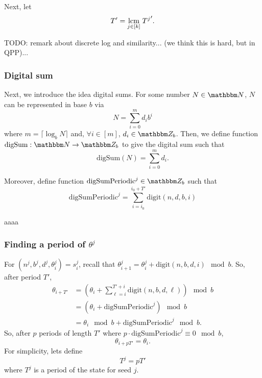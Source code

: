 \documentclass[11pt,titlepage]{article}
\newcommand{\rationalPeriod}{{T^j}'}
\newcommand{\rationalPeriodTotal}{{T}'}
\newcommand{\seedAngle}[1]{{\theta^j_{#1}}}
\newcommand{\seedAngleNotime}{{\theta}^j}
\newcommand{\digSumPeriodic}{\mathrm{digSumPeriodic}^j}
\begin{document}
Next, let $$
\rationalPeriodTotal = \lcm{j \in [k]}\; \rationalPeriod.
$$

\begin{remark}[Polytime]
  TODO: remark about discrete log and similarity... (we think this is hard, but in QPP)...
\end{remark}

\subsubsection{Digital sum}
Next, we introduce the idea digital sums.
For some number $N \in \N$, $N$ can be represented in base $b$ via
\begin{equation}
  N = \sum_{i=0}^{m} d_i b^i
\end{equation}
where $m = \lceil \log_b N \rceil$ and, $\forall i \in [m]$, $d_i \in \Z_b$.
Then, we define function $\mathrm{digSum}: \N \rightarrow \Z_b$
to give the digital sum such that
\begin{equation}
  \mathrm{digSum}(N) = \sum_{i=0}^{m} d_i.
\end{equation}

Moreover, define function $\digSumPeriodic \in \Z_b$
such that
\begin{equation}
  \digSumPeriodic = \sum_{i = i_0}^{i_0 + \rationalPeriodTotal} \mathrm{digit}(n, d, b, i)
\end{equation}

\begin{remark}
  aaaa
\end{remark}

\subsubsection{Finding a period of $\seedAngleNotime$} %
For $(n^j, b^j, d^j, \theta_i^j) = s_i^j$,
recall that $\seedAngle{i + 1} = \seedAngle{i} + \mathrm{digit}(n, b, d, i) \mod b$.
So, after period $\rationalPeriodTotal$,
\begin{align*}
  \theta_{i + \rationalPeriodTotal} &= \left(\theta_{i} + \sum_{\ell = i}^{\rationalPeriodTotal + i} \mathrm{digit}(n, b, d, \ell)\right) \mod b\\
  &= \left(\theta_{i} +  \digSumPeriodic\right) \mod b\\
  &= \theta_{i} \mod b +  \digSumPeriodic \mod b.
\end{align*}
So, after $p$ periods of length $\rationalPeriodTotal$ where $p  \cdot \digSumPeriodic \equiv 0 \mod b$,
$$
\theta_{i + p\rationalPeriodTotal} = \theta_i.
$$
For simplicity, lets define
$$
  T^j = p\rationalPeriodTotal
$$
where $T^j$ is a period of the state for seed $j$.
\end{document}
